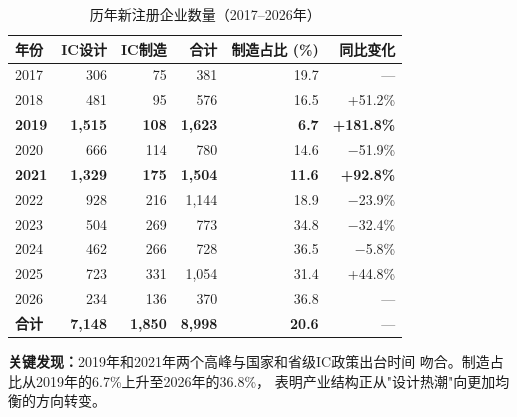 \documentclass[12pt,a4paper]{article}
\newcommand{\tableHeaderRow}{\rowcolor{tealPrimary}\color{white}}
\newcommand{\tableOddRow}{\rowcolor{mintBG}}
\newcommand{\tableEvenRow}{\rowcolor{white}}
\begin{document}
\begin{table}[H]
\centering
\small
\caption{历年新注册企业数量（2017--2026年）}
\label{tab:established}
\begin{tabular}{lrrrrr}
\toprule
\tableHeaderRow
\textbf{年份} & \textbf{IC设计} & \textbf{IC制造} & \textbf{合计} & \textbf{制造占比 (\%)} & \textbf{同比变化} \\
\midrule
\tableOddRow  2017 & 306 & 75  & 381  & 19.7 & ---      \\
\tableEvenRow 2018 & 481 & 95  & 576  & 16.5 & +51.2\%  \\
\tableOddRow  \textbf{2019} & \textbf{1,515} & \textbf{108} & \textbf{1,623} & \textbf{6.7} & \textbf{+181.8\%} \\
\tableEvenRow 2020 & 666 & 114 & 780  & 14.6 & $-$51.9\% \\
\tableOddRow  \textbf{2021} & \textbf{1,329} & \textbf{175} & \textbf{1,504} & \textbf{11.6} & \textbf{+92.8\%} \\
\tableEvenRow 2022 & 928 & 216 & 1,144 & 18.9 & $-$23.9\% \\
\tableOddRow  2023 & 504 & 269 & 773  & 34.8 & $-$32.4\% \\
\tableEvenRow 2024 & 462 & 266 & 728  & 36.5 & $-$5.8\%  \\
\tableOddRow  2025 & 723 & 331 & 1,054 & 31.4 & +44.8\%  \\
\tableEvenRow 2026 & 234 & 136 & 370  & 36.8 & ---      \\
\midrule
\tableOddRow  \textbf{合计} & \textbf{7,148} & \textbf{1,850} & \textbf{8,998} & \textbf{20.6} & --- \\
\bottomrule
\end{tabular}
\end{table}

\textbf{关键发现：}2019年和2021年两个高峰与国家和省级IC政策出台时间
吻合。制造占比从2019年的6.7\%上升至2026年的36.8\%，
表明产业结构正从"设计热潮"向更加均衡的方向转变。
\end{document}
